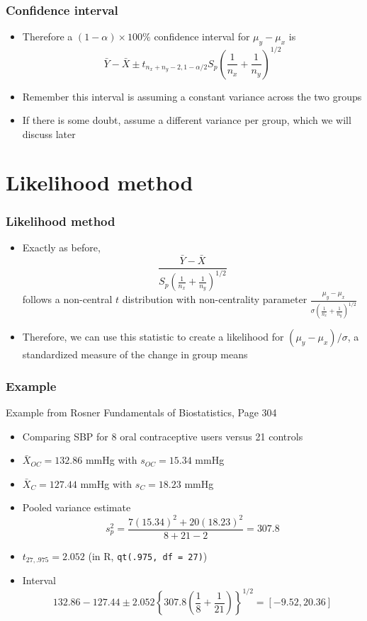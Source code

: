 \documentclass[aspectratio=169]{beamer}
\begin{document}
\begin{frame}\frametitle{Confidence interval}
  \begin{itemize}
  \item Therefore a $(1 - \alpha)\times 100\%$ confidence interval for
    $\mu_y - \mu_x$ is 
    $$
    \bar Y - \bar X \pm t_{n_x + n_y - 2, 1 - \alpha/2}S_p\left(\frac{1}{n_x} + \frac{1}{n_y}\right)^{1/2}
    $$
  \item Remember this interval is assuming a constant variance across the
    two groups
  \item If there is some doubt, assume a different variance per group, which
    we will discuss later
  \end{itemize}
\end{frame}

\section{Likelihood method}
\begin{frame}\frametitle{Likelihood method}
  \begin{itemize}
  \item Exactly as before, 
    $$
    \frac{\bar Y - \bar X}{S_p \left(\frac{1}{n_x} + \frac{1}{n_y}\right)^{1/2}}
    $$
    follows a non-central $t$ distribution with non-centrality parameter
    $\frac{\mu_y - \mu_x}{\sigma  \left(\frac{1}{n_x} + \frac{1}{n_y}\right)^{1/2}}$
  \item Therefore, we can use this statistic to create a likelihood for
    $(\mu_y - \mu_x) / \sigma$, a standardized measure of the change in
    group means
  \end{itemize}
\end{frame}

\begin{frame}\frametitle{Example}
Example from Rosner Fundamentals of Biostatistics, Page 304
\begin{itemize}
\item Comparing SBP for 8 oral contraceptive users versus 21 controls
\item $\bar X_{OC} = 132.86$ mmHg with $s_{OC} = 15.34$ mmHg
\item $\bar X_{C} = 127.44$ mmHg with $s_{C} = 18.23$ mmHg
\item Pooled variance estimate
$$
s_p^2 = \frac{7 (15.34)^2 + 20 (18.23)^2}{8 + 21 - 2} = 307.8
$$ 
\item $t_{27,.975} = 2.052$ (in R, \texttt{qt(.975, df = 27)})
\item Interval
$$
132.86 - 127.44 \pm 2.052 \left\{307.8 \left( \frac{1}{8} + \frac{1}{21}\right) \right\}^{1/2}
= [-9.52, 20.36]
$$
\end{itemize}
\end{frame}
\end{document}
